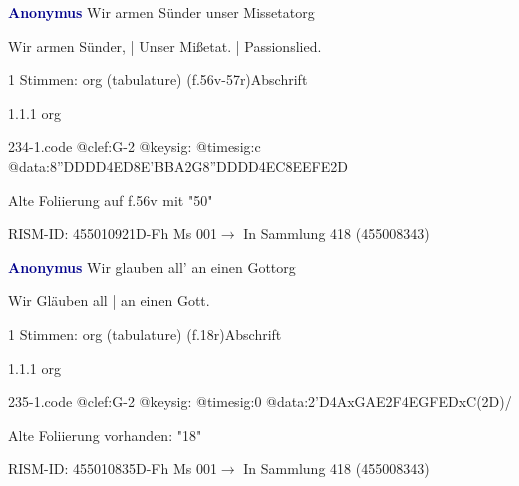 \documentclass[twocolumn, 12pt]{book}
\begin{document}
\par \vspace{16pt} \textcolor{darkblue}{\textbf{Anonymus  }}\hfillplus{\textbf{[234]}}\newline Wir armen Sünder unser Missetat\newline org
\par \begin{itshape}[f.56v, at left:] Wir armen Sünder, | Unser Mißetat. | Passionslied.\end{itshape} 
\par \textcolor{darkblue}{}  1 Stimmen: org (tabulature)  (f.56v-57r)\newline Abschrift
\par 1.1.1  org  
\begin{filecontents*}{234-1.code}
@clef:G-2
@keysig:
@timesig:c
@data:{8''DDDD}4ED{8E'BBA}2G{8''DDDD}4EC{8EEFE}2D
\end{filecontents*}
\newline %
\par Alte Foliierung auf f.56v mit "50"
\par RISM-ID: 455010921\newline D-Fh  Ms 001\newline $\rightarrow$ In Sammlung 418 (455008343)
      
\par \vspace{16pt} \textcolor{darkblue}{\textbf{Anonymus  }}\hfillplus{\textbf{[235]}}\newline Wir glauben all' an einen Gott\newline org
\par \begin{itshape}[f.18r, at left:] Wir Gläuben all | an einen Gott.\end{itshape} 
\par \textcolor{darkblue}{}  1 Stimmen: org (tabulature)  (f.18r)\newline Abschrift
\par 1.1.1  org  
\begin{filecontents*}{235-1.code}
@clef:G-2
@keysig:
@timesig:0
@data:2'D4AxGAE2F4EGFEDxC(2D)/
\end{filecontents*}
\newline %
\par Alte Foliierung vorhanden: "18"
\par RISM-ID: 455010835\newline D-Fh  Ms 001\newline $\rightarrow$ In Sammlung 418 (455008343)
      
\end{document}
